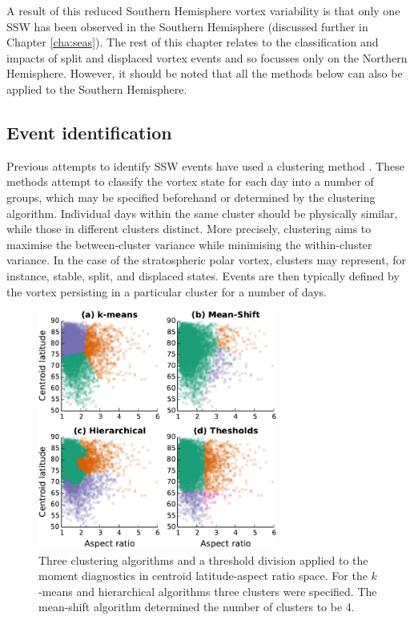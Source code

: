 A result of this reduced Southern Hemisphere vortex variability is that only one
SSW has been observed in the Southern Hemisphere (discussed further in Chapter
\ref{cha:seas}). The rest of this chapter relates to the classification and
impacts of split and displaced vortex events and so focusses only on the
Northern Hemisphere. However, it should be noted that all the methods below can
also be applied to the Southern Hemisphere.


\subsection{Event identification}
\label{sec:event-definition}

Previous attempts to identify SSW events have used a clustering method
\citep{K.Coughlin2009,Hannachi2010}. These methods attempt to classify the
vortex state for each day into a number of groups, which may be specified
beforehand or determined by the clustering algorithm. Individual days within the
same cluster should be physically similar, while those in different clusters
distinct. More precisely, clustering aims to maximise the between-cluster
variance while minimising the within-cluster variance. In the case of the
stratospheric polar vortex, clusters may represent, for instance, stable, split,
and displaced states. Events are then typically defined by the vortex persisting
in a particular cluster for a number of days.

\begin{figure}
 \centering
 \noindent\includegraphics[width=0.7\textwidth]{figures/chapter-moments/clustering.pdf}
 \caption[Clustering algorithms applied to the moment diagnostics.]{Three
   clustering algorithms and a threshold division applied to the moment
   diagnostics in centroid latitude-aspect ratio space. For the $k$-means and
   hierarchical algorithms three clusters were specified. The mean-shift
   algorithm determined the number of clusters to be 4.}
 \label{fig:clusters}
\end{figure}

